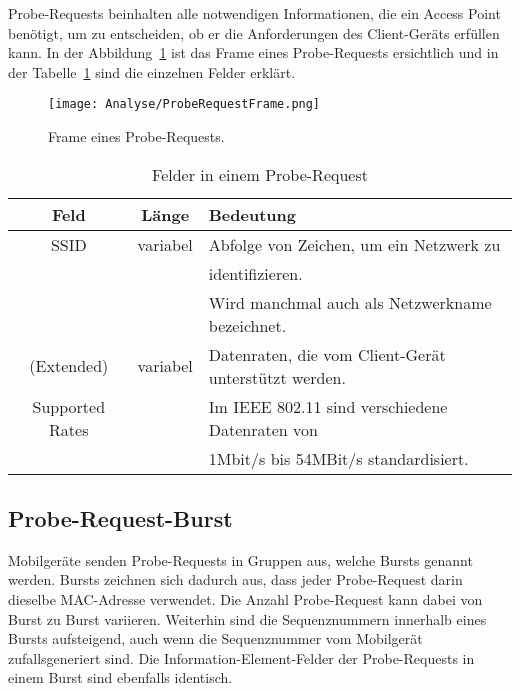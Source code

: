 Probe-Requests beinhalten alle notwendigen Informationen, die ein Access Point
benötigt, um zu entscheiden, ob er die Anforderungen des Client-Geräts 
erfüllen kann. In der Abbildung~\ref{figure:proberequestframe} ist das Frame
eines Probe-Requests ersichtlich und in der Tabelle~\ref{table:proberequestframe}
sind die einzelnen Felder erklärt.

\begin{figure}[h!]
	\centering
	\texttt{[image: Analyse/ProbeRequestFrame.png]}
    \caption{Frame eines Probe-Requests.
	\label{figure:proberequestframe}}
\end{figure}

\begin{table}[h!]
	\centering
	\begin{tabular}{|c|c|l|}
		\hline
        \textbf{Feld} & \textbf{Länge} & \textbf{Bedeutung} \\
        \hline
        SSID & variabel & 
        Abfolge von Zeichen, um ein Netzwerk zu \\ 
        && identifizieren. \\
        && Wird manchmal auch als Netzwerkname bezeichnet. \\
        \hline
        (Extended) & variabel & 
        Datenraten, die vom Client-Gerät unterstützt werden. \\
        Supported Rates & & 
        Im IEEE 802.11 sind verschiedene Datenraten von \\
        && 1Mbit/s bis 54MBit/s standardisiert. \\
        \hline
    \end{tabular}
    \caption{Felder in einem Probe-Request
    \label{table:proberequestframe}}  
\end{table}



\clearpage

\subsection{Probe-Request-Burst}
Mobilgeräte senden Probe-Requests in Gruppen aus, welche Bursts genannt werden. 
Bursts zeichnen sich dadurch aus, dass jeder Probe-Request darin dieselbe MAC-Adresse 
verwendet. Die Anzahl Probe-Request kann dabei von Burst zu Burst variieren.
 Weiterhin sind die Sequenznummern innerhalb eines Bursts aufsteigend, 
auch wenn die Sequenznummer vom Mobilgerät zufallsgeneriert sind.
Die Information-Element-Felder der Probe-Requests  in einem Burst sind ebenfalls 
identisch.

